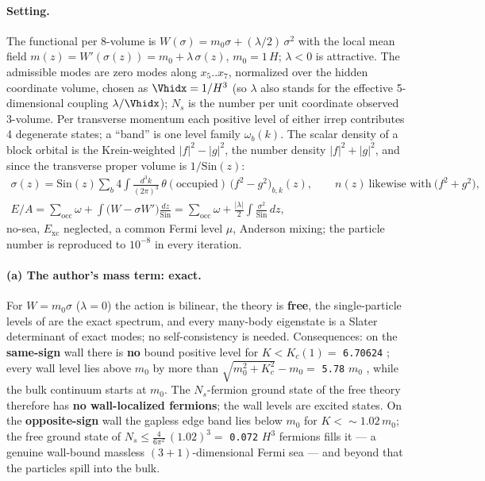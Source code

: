\paragraph{Setting.} The functional per 8-volume is $W(\sigma)=m_0\sigma+(\lambda/2)\,\sigma^2$ with the
local mean field $m(z)=W'(\sigma(z))=m_0+\lambda\,\sigma(z)$, $m_0=1\,H$; $\lambda<0$ is attractive. The
admissible modes are zero modes along $x_5..x_7$, normalized over the hidden coordinate volume, chosen as
$\Vhidx=1/H^3$ (so $\lambda$ also stands for the effective 5-dimensional coupling $\lambda/\Vhidx$); $N_s$ is
the number per unit coordinate observed 3-volume. Per transverse momentum each positive level of either
irrep contributes 4 degenerate states; a ``band'' is one level family $\omega_b(k)$. The scalar density of
a block orbital is the Krein-weighted $|f|^2-|g|^2$, the number density $|f|^2+|g|^2$, and since the
transverse proper volume is $1/\mathrm{Sin}(z)$:
\begin{gather*}
  \sigma(z)=\mathrm{Sin}(z)\sum_b4\int\frac{d^3k}{(2\pi)^3}\,\theta(\text{occupied})\,\bigl(f^2-g^2\bigr)_{b,k}(z),\qquad
  n(z)\ \text{likewise with}\ \bigl(f^2+g^2\bigr),\\
  E/A=\sum_{\mathrm{occ}}\omega+\int\bigl(W-\sigma W'\bigr)\frac{dz}{\mathrm{Sin}}
  =\sum_{\mathrm{occ}}\omega+\frac{|\lambda|}{2}\int\frac{\sigma^2}{\mathrm{Sin}}\,dz ,
\end{gather*}
no-sea, $E_{\mathrm{xc}}$ neglected, a common Fermi level $\mu$, Anderson mixing; the particle number is
reproduced to $10^{-8}$ in every iteration.

\paragraph{(a) The author's mass term: exact.} For $W=m_0\sigma$ ($\lambda=0$) the action is bilinear, the
theory is \textbf{free}, the single-particle levels of  are the exact spectrum, and every
many-body eigenstate is a Slater determinant of exact modes; no self-consistency is needed. Consequences:
on the \textbf{same-sign} wall there is \textbf{no} bound positive level for $K<K_c(1)=$ \texttt{6.70624}
; every wall level lies above $m_0$ by more than
$\sqrt{m_0^2+K_c^2}-m_0=$ \texttt{5.78} $m_0$ , while the bulk continuum starts at
$m_0$. The $N_s$-fermion ground state of the free theory therefore has \textbf{no wall-localized fermions};
the wall levels are excited states. On the \textbf{opposite-sign} wall the gapless edge band lies below
$m_0$ for $K<{\sim}1.02\,m_0$; the free ground state of $N_s\leq\frac{4}{6\pi^2}\,(1.02)^3=$ \texttt{0.072} $H^3$
 fermions fills it --- a genuine wall-bound massless $(3+1)$-dimensional Fermi sea ---
and beyond that the particles spill into the bulk.


